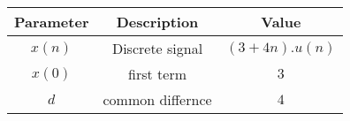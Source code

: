 \begin{tabular}{|c|c|c|}
\hline
     \textbf{Parameter} & \textbf{Description} & \textbf{Value} \\
     \hline
     $x(n)$ & Discrete signal & $(3 +4n).u(n)$\\
     \hline
     $x(0)$ & first term & $3$\\
     \hline
     $d$ & common differnce & $4$ \\
     \hline
\end{tabular}
